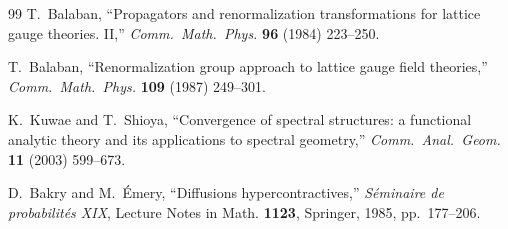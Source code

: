 \begin{thebibliography}{99}
T.~Balaban, ``Propagators and renormalization transformations for lattice gauge theories. II,''
\textit{Comm.\ Math.\ Phys.} \textbf{96} (1984) 223--250.

T.~Balaban, ``Renormalization group approach to lattice gauge field theories,'' 
\textit{Comm.\ Math.\ Phys.} \textbf{109} (1987) 249--301.

K.~Kuwae and T.~Shioya, ``Convergence of spectral structures: a functional analytic theory and its applications to spectral geometry,''
\textit{Comm.\ Anal.\ Geom.} \textbf{11} (2003) 599--673.

D.~Bakry and M.~\'Emery, ``Diffusions hypercontractives,'' 
\textit{S\'eminaire de probabilit\'es XIX}, Lecture Notes in Math. \textbf{1123}, Springer, 1985, pp.\ 177--206.

\end{thebibliography}






